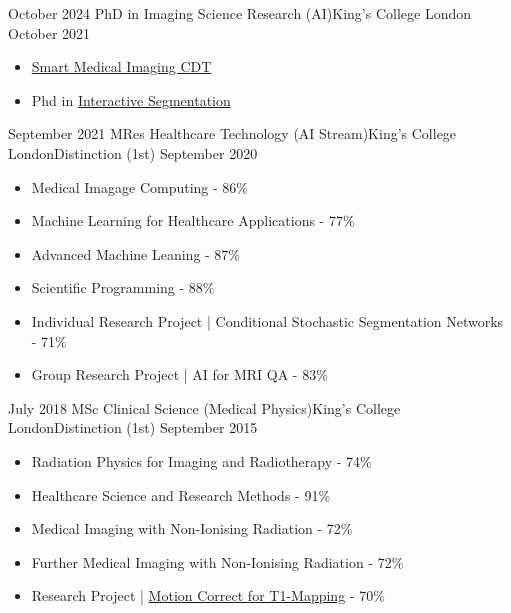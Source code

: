 %
%
%


\begin{education}
		\degree
	{October 2024} {PhD in Imaging Science Research (AI)}{King's College London}{}
	{October 2021} {
		\begin{itemize}
			\item {\color{linkcolor}\href{https://www.imagingcdt.com/}{Smart Medical Imaging CDT}}
			\item Phd in  {\color{linkcolor}\href{https://www.imagingcdt.com/project/active-and-continual-learning-strategies-for-deep-learning-assisted-interactive-segmentation-of-new-databases/}{Interactive Segmentation}}
		\end{itemize}
	}
	\emptySeparator
	
	\degree
	{September 2021}   {MRes Healthcare Technology (AI Stream)}{King's College London}{Distinction (1st)}
	{September 2020} {
		\begin{itemize}
			\item Medical Imagage Computing - 86\%
			\item Machine Learning for Healthcare Applications - 77\%
			\item Advanced Machine Leaning - 87\%
			\item Scientific Programming - 88\%
			\item Individual Research Project | Conditional Stochastic Segmentation Networks - 71\%
			\item Group Research Project | AI for MRI QA - 83\%
		\end{itemize}
	}
	\emptySeparator
	
  \degree
    {July 2018}   {MSc Clinical Science (Medical Physics)}{King's College London}{Distinction (1st)}
    {September 2015} {
                      \begin{itemize}
                        \item Radiation Physics for Imaging and Radiotherapy - 74\%
                          \item Healthcare Science and Research Methods - 91\%
                          \item Medical Imaging with Non-Ionising Radiation - 72\%
                          \item Further Medical Imaging with Non-Ionising Radiation - 72\%
                          \item Research Project | {\color{linkcolor}\href{https://drive.google.com/file/d/1OW5mCCDkiLmFHwEo0NrTMILELdWyMrdJ/view?usp=sharing}{Motion Correct for T1-Mapping}} - 70\%
                      \end{itemize}
                    }
  \emptySeparator


\end{education}

